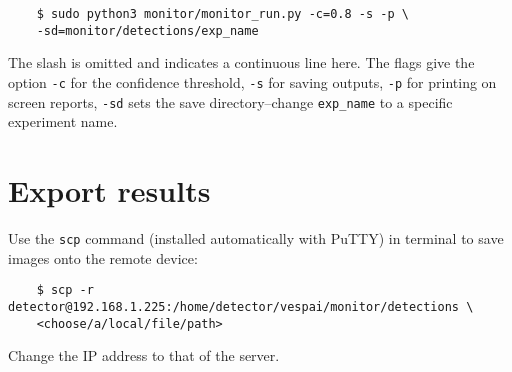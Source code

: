 \documentclass[12pt, a4paper, oneside]{article}
\begin{document}
\begin{verbatim}
	$ sudo python3 monitor/monitor_run.py -c=0.8 -s -p \
	-sd=monitor/detections/exp_name
\end{verbatim}
The slash is omitted and indicates a continuous line here. The flags give the option \texttt{-c} for the confidence threshold, \texttt{-s} for saving outputs, \texttt{-p} for printing on screen reports, \texttt{-sd} sets the save directory--change \texttt{exp\_name} to a specific experiment name.

\section{Export results}

Use the \texttt{scp} command (installed automatically with PuTTY) in terminal to save images onto the remote device:
\begin{verbatim}
	$ scp -r detector@192.168.1.225:/home/detector/vespai/monitor/detections \
	<choose/a/local/file/path>
\end{verbatim}
Change the IP address to that of the server.
\end{document}
